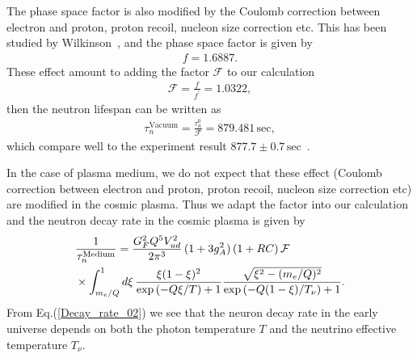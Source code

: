 The phase space factor is also modified by the Coulomb correction between electron and proton, proton recoil, nucleon size correction etc. This has been studied by Wilkinson~\cite{Wilkinson:1982hu}, and the phase space factor is given by~\cite{Czarnecki:2018okw,Czarnecki:2004cw,Wilkinson:1982hu}
\begin{align}
f=1.6887.
\end{align}
These effect amount to adding the factor $\mathcal{F}$ to our calculation
\begin{align}
\mathcal{F}=\frac{f}{f^\prime}=1.0322,
\end{align}
then the neutron lifespan can be written as 
\begin{align}
\tau^{\mathrm{Vacuum}}_n=\frac{\tau^0_n}{\mathcal{F}}=879.481\,\mathrm{sec},
\end{align}
which compare well to the experiment result $877.7\pm0.7\,\mathrm{sec}$~\cite{Pattie:2017vsj}. 

In the case of plasma medium, we do not expect that these effect (Coulomb correction between electron and proton, proton recoil, nucleon size correction etc) are modified in the cosmic plasma. Thus we adapt the factor into our calculation and the neutron decay rate in the cosmic plasma is given by
\begin{align}
\label{Decay_rate_02}
&\frac{1}{\tau_n^{\mathrm{Medium}}}=\frac{G^2_FQ^5V^2_{ud}}{2\pi^3}\,(1+3g^2_A)\,(1+RC)\,\mathcal{F}\\
&\times\int^1_{m_e/Q}d\xi\,\frac{\xi(1-\xi)^2}{\exp\left(-Q\xi/{T}\right)+1}\frac{\sqrt{\xi^2-(m_e/Q)^2}}{\exp\left(-Q(1-\xi)/T_\nu\right)+1}.\notag
\end{align}
From Eq.(\ref{Decay_rate_02}) we see that the neuron decay rate in the early universe depends on both the photon temperature $T$ and the neutrino effective temperature $T_\nu$.


